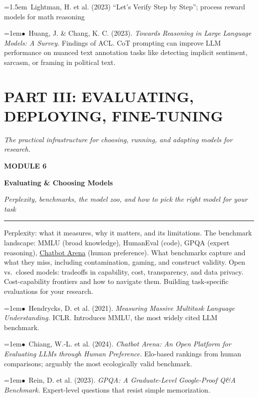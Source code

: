 \documentclass[11pt, a4paper]{article}
\newcommand{\modulehead}[3]{%
  \vspace{0.5em}
  {\small\sffamily\bfseries\textcolor{accent}{MODULE #1}}\par\vspace{-0.3em}
  {\Large\sffamily\bfseries\textcolor{dark}{#2}}\par\vspace{-0.2em}
  {\small\textit{\textcolor{muted}{#3}}}\par
  \vspace{0.2em}\textcolor{bordercol}{\rule{\textwidth}{0.3pt}}\par
}
\newcommand{\seclabel}[1]{%
  \vspace{0.6em}{\normalsize\sffamily\bfseries\textcolor{accent}{#1}}\par\vspace{0.2em}
}
\newcommand{\refpaper}[1]{%
  \par\hangindent=1em\hangafter=1\noindent\textcolor{accent}{\small$\bullet$}~{\small #1}\par
}
\newcommand{\resource}[1]{%
  \par\hangindent=1.5em\hangafter=1\noindent\hspace{0.5em}{\small\textcolor{accent}{\guilsinglright}}~{\small #1}\par
}
\begin{document}
\resource{Lightman, H. et al. (2023) ``Let's Verify Step by Step''; process reward models for math reasoning}

\seclabel{Reasoning and Analytical Complexity}

\refpaper{Huang, J. \& Chang, K. C. (2023). \textit{Towards Reasoning in Large Language Models: A Survey.} Findings of ACL. CoT prompting can improve LLM performance on nuanced text annotation tasks like detecting implicit sentiment, sarcasm, or framing in political text.}



\newpage
\section{PART III: EVALUATING, DEPLOYING, FINE-TUNING}
{\textit{\textcolor{muted}{The practical infrastructure for choosing, running, and adapting models for research.}}}

\vspace{1em}

\modulehead{6}{Evaluating \& Choosing Models}{Perplexity, benchmarks, the model zoo, and how to pick the right model for your task}

\seclabel{Core Concepts}

Perplexity: what it measures, why it matters, and its limitations. The benchmark landscape: MMLU (broad knowledge), HumanEval (code), GPQA (expert reasoning), \href{https://huggingface.co/spaces/lmarena-ai/chatbot-arena}{Chatbot Arena} (human preference). What benchmarks capture and what they miss, including contamination, gaming, and construct validity. Open vs.\ closed models: tradeoffs in capability, cost, transparency, and data privacy. Cost-capability frontiers and how to navigate them. Building task-specific evaluations for your research.

\seclabel{Core Readings}

\refpaper{Hendrycks, D. et al. (2021). \textit{Measuring Massive Multitask Language Understanding.} ICLR. Introduces MMLU, the most widely cited LLM benchmark.}

\refpaper{Chiang, W.-L. et al. (2024). \textit{Chatbot Arena: An Open Platform for Evaluating LLMs through Human Preference.} Elo-based rankings from human comparisons; arguably the most ecologically valid benchmark.}

\refpaper{Rein, D. et al. (2023). \textit{GPQA: A Graduate-Level Google-Proof Q\&A Benchmark.} Expert-level questions that resist simple memorization.}
\end{document}
